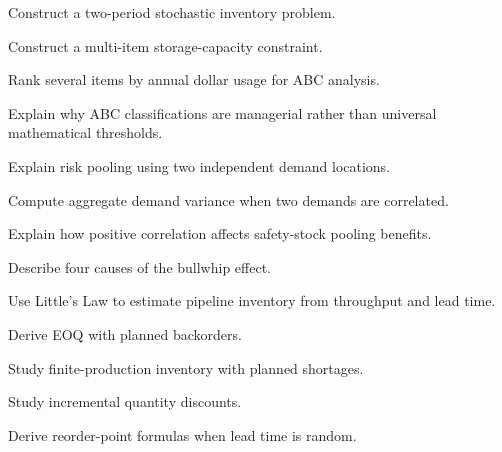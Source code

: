 \begin{exercise}[3]
Construct a two-period stochastic inventory problem.
\end{exercise}

\begin{exercise}[3]
Construct a multi-item storage-capacity constraint.
\end{exercise}

\begin{exercise}[3]
Rank several items by annual dollar usage for ABC analysis.
\end{exercise}

\begin{exercise}[3]
Explain why ABC classifications are managerial rather than universal
mathematical thresholds.
\end{exercise}

\begin{exercise}[3]
Explain risk pooling using two independent demand locations.
\end{exercise}

\begin{exercise}[3]
Compute aggregate demand variance when two demands are correlated.
\end{exercise}

\begin{exercise}[3]
Explain how positive correlation affects safety-stock pooling benefits.
\end{exercise}

\begin{exercise}[3]
Describe four causes of the bullwhip effect.
\end{exercise}

\begin{exercise}[3]
Use Little's Law to estimate pipeline inventory from throughput and lead
time.
\end{exercise}

\begin{exercise}[4]
Derive EOQ with planned backorders.
\end{exercise}

\begin{exercise}[4]
Study finite-production inventory with planned shortages.
\end{exercise}

\begin{exercise}[4]
Study incremental quantity discounts.
\end{exercise}

\begin{exercise}[4]
Derive reorder-point formulas when lead time is random.
\end{exercise}

